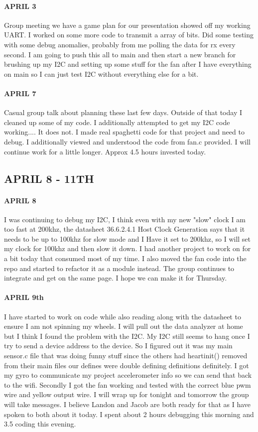 \documentclass{article}
\begin{document}
\paragraph{APRIL 3} Group meeting we have a game plan for our presentation showed off my working UART. I worked on some more code to transmit a array of bits. Did some testing with some debug anomalies, probably from me polling the data for rx every second. I am going to push this all to main and then start a new branch for brushing up my I2C and setting up some stuff for the fan after I have everything on main so I can just test I2C without everything else for a bit.
\paragraph{APRIL 7} Casual group talk about planning these last few days. Outside of that today I cleaned up some of my code. I additionally attempted to get my I2C code working.... It does not. I made real spaghetti code for that project and need to debug. I additionally viewed and understood the code from fan.c provided. I will continue work for a little longer. Approx 4.5 hours invested today.
\subsection{APRIL 8 - 11TH}

\paragraph{APRIL 8} I was continuing to debug my I2C, I think even with my new "slow" clock I am too fast at 200khz, the datasheet 36.6.2.4.1 Host Clock Generation says that it needs to be up to 100khz for slow mode and I Have it set to 200khz, so I will set my clock for 100khz and then slow it down. I had another project to work on for a bit today that consumed most of my time. I also moved the fan code into the repo and started to refactor it as a module instead. The group continues to integrate and get on the same page. I hope we can make it for Thursday. 
\paragraph{APRIL 9th} I have started to work on code while also reading along with the datasheet to ensure I am not spinning my wheels. I will pull out the data analyzer at home but I think I found the problem with the I2C. My I2C still seems to hang once I try to send a device address to the device. So I figured out it was my main sensor.c file that was doing funny stuff since the others had heartinit() removed from their main files our defines were double defining definitions definitely. I got my gyro to communicate my project accelerometer info so we can send that back to the wifi. Secondly I got the fan working and tested with the correct blue pwm wire and yellow output wire. I will wrap up for tonight and tomorrow the group will take messages. I believe Landon and Jacob are both ready for that as I have spoken to both about it today. I spent about 2 hours debugging this morning and 3.5 coding this evening. 
\end{document}
